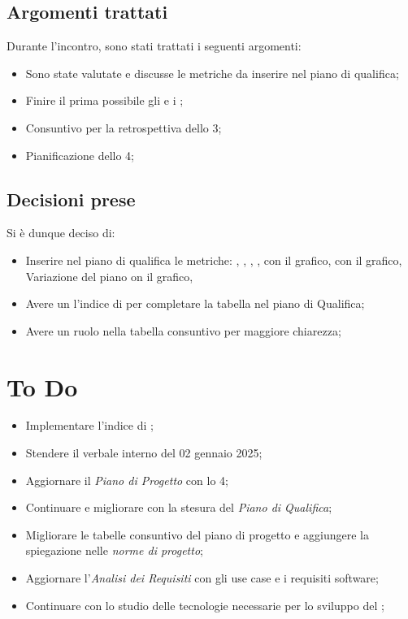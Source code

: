 \documentclass[a4paper, 12pt]{article}
\begin{document}
\subsection{Argomenti trattati}
Durante l'incontro, sono stati trattati i seguenti argomenti:
\begin{itemize}
    \item Sono state valutate e discusse le metriche da inserire nel piano di qualifica;
    \item Finire il prima possibile gli  e i ;
    \item Consuntivo per la retrospettiva dello  3;
    \item Pianificazione dello  4;
\end{itemize}
\subsection{Decisioni prese}
Si è dunque deciso di:
\begin{itemize}
    \item Inserire nel piano di qualifica le metriche:
    , 
    ,
    ,
    ,
     con il grafico,
     con il grafico,
    Variazione del piano on il grafico,
    \item Avere un l'indice di  per completare la tabella nel piano di Qualifica;
    \item Avere un ruolo nella tabella consuntivo per maggiore chiarezza;
    
\end{itemize}
\section{To Do}
\begin{itemize}
    \item Implementare l'indice di ;
    \item Stendere il verbale interno del 02 gennaio 2025;
    \item Aggiornare il \textit{Piano di Progetto} con lo  4;
    \item Continuare e migliorare con la stesura del \textit{Piano di Qualifica};
    \item Migliorare le tabelle consuntivo del piano di progetto e aggiungere la spiegazione nelle \textit{norme di progetto};
    \item Aggiornare l'\textit{Analisi dei Requisiti} con gli use case e i requisiti software;
    \item Continuare con lo studio delle tecnologie necessarie per lo sviluppo del ;
\end{itemize}
\end{document}
